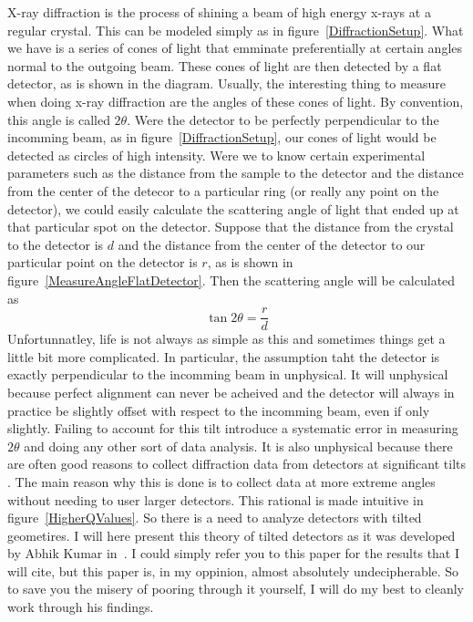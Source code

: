 X-ray diffraction is the process of shining a beam of 
high energy x-rays at a regular crystal. This can be 
modeled simply as in figure~\ref{DiffractionSetup}. 
What we have is a series of cones of light that 
emminate preferentially at certain angles normal to 
the outgoing beam. These cones of light are then 
detected by a flat detector, as is shown in the 
diagram. Usually, the interesting thing to measure 
when doing x-ray diffraction are the angles of these 
cones of light. By convention, this angle is called 
$2\theta$. Were the detector to be perfectly perpendicular 
to the incomming beam, as in figure~\ref{DiffractionSetup}, 
our cones of light would be detected as circles of high 
intensity. Were we to know certain experimental parameters 
such as the distance from the sample to the detector and 
the distance from the center of the detecor to a 
particular ring (or really any point on the detector), 
we could easily calculate the scattering angle of light 
that ended up at that particular spot on the detector. 
Suppose that the distance from the crystal to the detector 
is $d$ and the distance from the center of the detector 
to our particular point on the detector is $r$, as is 
shown in figure~\ref{MeasureAngleFlatDetector}. Then the 
scattering angle will be calculated as
\begin{equation}
    \tan2\theta = \frac{r}{d}
\end{equation}
Unfortunnatley, life is not always as simple as this and 
sometimes things get a little bit more complicated. In 
particular, the assumption taht the detector is exactly 
perpendicular to the incomming beam in unphysical. It 
will unphysical because perfect alignment can never be 
acheived and the detector will always in practice be 
slightly offset with respect to the incomming beam, even 
if only slightly. Failing to account for this tilt introduce 
a systematic error in measuring $2\theta$ and doing any other 
sort of data analysis. It is also unphysical because there 
are often good reasons to collect diffraction data from 
detectors at significant tilts . The main reason why this 
is done is to collect data at more extreme angles without 
needing to user larger detectors. This rational is made 
intuitive in figure~\ref{HigherQValues}. So there is a 
need to analyze detectors with tilted geometires. I will 
here present this theory of tilted detectors as it was 
developed by Abhik Kumar in~\cite{Kumar05}.
I could simply refer you to this paper for the results
that I will cite, but this paper is, in my oppinion,
almost absolutely undecipherable. So to save you the
misery of pooring through it yourself, I will do
my best to cleanly work through his findings. 

